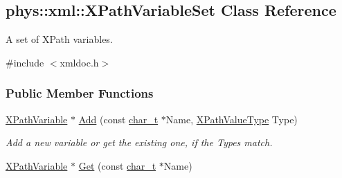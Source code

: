 \hypertarget{classphys_1_1xml_1_1XPathVariableSet}{
\subsection{phys::xml::XPathVariableSet Class Reference}
\label{classphys_1_1xml_1_1XPathVariableSet}
}


A set of XPath variables.  




{\ttfamily \#include $<$xmldoc.h$>$}

\subsubsection*{Public Member Functions}
\begin{DoxyCompactItemize}
\item 
\hyperlink{classphys_1_1xml_1_1XPathVariable}{XPathVariable} $\ast$ \hyperlink{classphys_1_1xml_1_1XPathVariableSet_a26c9bb8f7aa3aaedfcdcdca2e1822deb}{Add} (const \hyperlink{namespacephys_1_1xml_afc87705cd1c2917d87b879715a2d8f6e}{char\_\-t} $\ast$Name, \hyperlink{namespacephys_1_1xml_a339b9eef674ba44100110e5524bc575d}{XPathValueType} Type)
\begin{DoxyCompactList}\small\item\em Add a new variable or get the existing one, if the Types match. \item\end{DoxyCompactList}\item 
\hypertarget{classphys_1_1xml_1_1XPathVariableSet_aaf4a46b271298bbb86a6379567e590ee}{
\hyperlink{classphys_1_1xml_1_1XPathVariable}{XPathVariable} $\ast$ \hyperlink{classphys_1_1xml_1_1XPathVariableSet_aaf4a46b271298bbb86a6379567e590ee}{Get} (const \hyperlink{namespacephys_1_1xml_afc87705cd1c2917d87b879715a2d8f6e}{char\_\-t} $\ast$Name)}
\label{classphys_1_1xml_1_1XPathVariableSet_aaf4a46b271298bbb86a6379567e590ee}


\end{DoxyCompactItemize}

